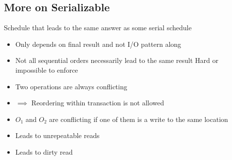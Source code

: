 \subsection{More on Serializable}
\begin{itemize}
     Schedule that leads to the same answer as some serial schedule
        \begin{itemize}
            \item Only depends on final result and not I/O pattern along
            \item Not all sequential orders necessarily lead to the same result
            \icon Hard or impossible to enforce
        \end{itemize}
        \begin{itemize}
                \begin{itemize}
                        \begin{itemize}
                            \item Two operations are always conflicting
                            \item $\implies$ Reordering within transaction is not allowed
                        \end{itemize}
                        \begin{itemize}
                            \item $O_1$ and $O_2$ are conflicting if one of them is a write to the same location
                        \end{itemize}
                \end{itemize}
                \begin{itemize}
                        \begin{itemize}
                            \item Leads to unrepeatable reads
                        \end{itemize}
                        \begin{itemize}
                            \item Leads to dirty read
                        \end{itemize}
                        \begin{itemize}

\end{itemize}
\end{itemize}
\end{itemize}
\end{itemize}
